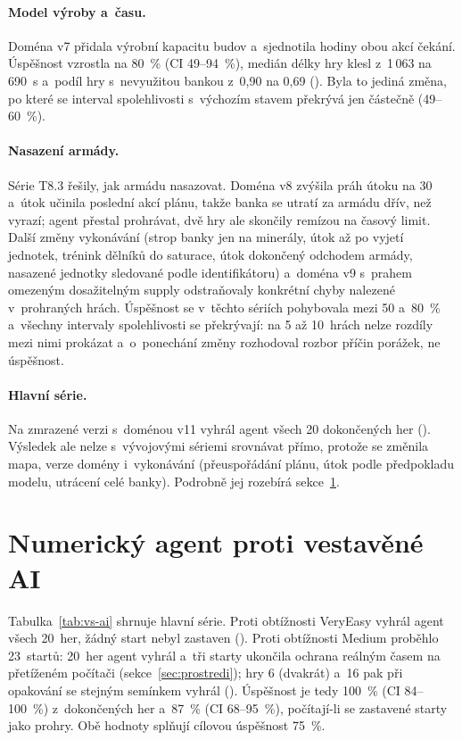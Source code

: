 \paragraph{Model výroby a~času.} Doména v7 přidala výrobní kapacitu budov a~sjednotila hodiny obou akcí čekání. Úspěšnost vzrostla na 80~\% (CI 49--94~\%), medián délky hry klesl z~1\,063 na 690~s a~podíl hry s~nevyužitou bankou z~0,90 na 0,69 (). Byla to jediná změna, po které se interval spolehlivosti s~výchozím stavem překrývá jen částečně (49--60~\%).

\paragraph{Nasazení armády.} Série T8.3 řešily, jak armádu nasazovat. Doména v8 zvýšila práh útoku na 30 a~útok učinila poslední akcí plánu, takže banka se utratí za armádu dřív, než vyrazí; agent přestal prohrávat, dvě hry ale skončily remízou na časový limit. Další změny vykonávání (strop banky jen na minerály, útok až po vyjetí jednotek, trénink dělníků do saturace, útok dokončený odchodem armády, nasazené jednotky sledované podle identifikátoru) a~doména v9 s~prahem omezeným dosažitelným supply odstraňovaly konkrétní chyby nalezené v~prohraných hrách. Úspěšnost se v~těchto sériích pohybovala mezi 50 a~80~\% a~všechny intervaly spolehlivosti se překrývají: na 5 až 10~hrách nelze rozdíly mezi nimi prokázat a~o~ponechání změny rozhodoval rozbor příčin porážek, ne úspěšnost.

\paragraph{Hlavní série.} Na zmrazené verzi s~doménou v11 vyhrál agent všech 20 dokončených her (). Výsledek ale nelze s~vývojovými sériemi srovnávat přímo, protože se změnila mapa, verze domény i~vykonávání (přeuspořádání plánu, útok podle předpokladu modelu, utrácení celé banky). Podrobně jej rozebírá sekce~\ref{sec:vs-ai}.

\section{Numerický agent proti vestavěné AI}
\label{sec:vs-ai}

Tabulka~\ref{tab:vs-ai} shrnuje hlavní série. Proti obtížnosti VeryEasy vyhrál agent všech 20~her, žádný start nebyl zastaven (). Proti obtížnosti Medium proběhlo 23~startů: 20~her agent vyhrál a~tři starty ukončila ochrana reálným časem na přetíženém počítači (sekce~\ref{sec:prostredi}); hry 6 (dvakrát) a~16 pak při opakování se stejným semínkem vyhrál (). Úspěšnost je tedy 100~\% (CI 84--100~\%) z~dokončených her a~87~\% (CI 68--95~\%), počítají-li se zastavené starty jako prohry. Obě hodnoty splňují cílovou úspěšnost 75~\%.

